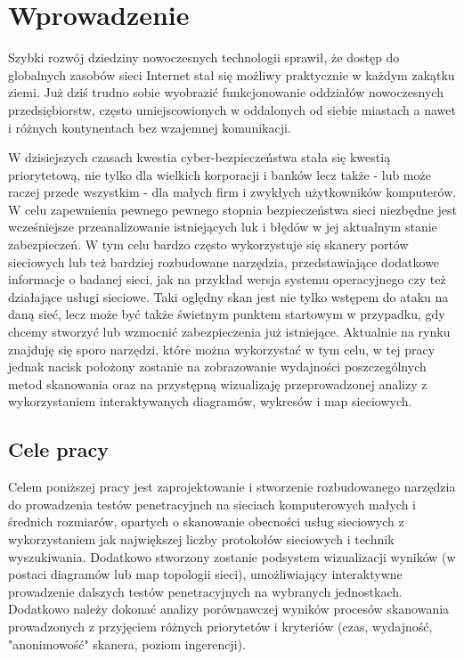 \chapter{Wprowadzenie}
\label{cha:wprowadzenie}

Szybki rozwój dziedziny nowoczesnych technologii sprawił, że dostęp do
globalnych zasobów sieci Internet stał się możliwy praktycznie w każdym zakątku
ziemi. Już dziś trudno sobie wyobrazić funkcjonowanie oddziałów nowoczesnych
przedsiębiorstw, często umiejscowionych w oddalonych od siebie miastach a nawet i
różnych kontynentach bez wzajemnej komunikacji.

W dzisiejszych czasach kwestia cyber-bezpieczeństwa stała się kwestią priorytetową, nie tylko dla wielkich korporacji i banków lecz także - lub może raczej przede wszystkim - dla małych firm i zwykłych użytkowników komputerów. W celu zapewnienia pewnego pewnego stopnia bezpieczeństwa sieci niezbędne jest wcześniejsze przeanalizowanie istniejących luk i błędów w jej aktualnym stanie zabezpieczeń. W tym celu bardzo często wykorzystuje się skanery portów sieciowych lub też bardziej rozbudowane narzędzia, przedstawiające dodatkowe informacje o badanej sieci, jak na przykład wersja systemu operacyjnego czy też działające usługi sieciowe. Taki oględny skan jest nie tylko wstępem do ataku na daną sieć, lecz może być także świetnym punktem startowym w przypadku, gdy chcemy stworzyć lub wzmocnić zabezpieczenia już istniejące. Aktualnie na rynku znajduję się sporo narzędzi, które można wykorzystać w tym celu, w tej pracy jednak nacisk położony zostanie na zobrazowanie wydajności poszczególnych metod skanowania oraz na przystępną wizualizaję przeprowadzonej analizy z wykorzystaniem interaktywanych diagramów, wykresów i map sieciowych.



\iffalse
☑ Co? Przedmiot, problem
☑ Jak? (Metoda , krótko)
☐ Dlaczego? Źródła problemu badawczego
☐ Po co? Implikacje, konsekwencje, walory
☐ Co będzie w kolejnych rozdziałach?
\fi

\section{Cele pracy}
\label{sec:celePracy}

Celem poniższej pracy jest zaprojektowanie i stworzenie rozbudowanego narzędzia do prowadzenia testów penetracyjnch na sieciach komputerowych małych i średnich rozmiarów, opartych o skanowanie obecności usług sieciowych z wykorzystaniem jak największej liczby protokołów sieciowych i technik wyszukiwania. Dodatkowo stworzony zostanie podsystem wizualizacji wyników (w postaci diagramów lub map topologii sieci), umożliwiający interaktywne prowadzenie dalszych testów penetracyjnych na wybranych jednostkach. Dodatkowo należy dokonać analizy porównawczej wyników procesów skanowania prowadzonych z przyjęciem różnych priorytetów i kryteriów (czas, wydajność, "anonimowość" skanera, poziom ingerencji).


